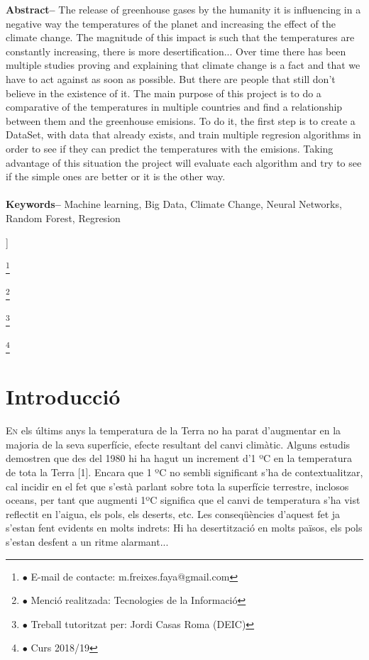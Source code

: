 \documentclass[10pt,a4paper,twocolumn,twoside]{article}
\newcommand\blfootnote[1]{%
  \begingroup
  \renewcommand\thefootnote{}\footnote{#1}%
  \addtocounter{footnote}{-1}%
  \endgroup
}
\begin{document}
\begin{@twocolumnfalse}
\begin{center}
{\textbf{Abstract--} The release of greenhouse gases by the humanity it is influencing in a negative way the temperatures of the planet and increasing the effect of the climate change. The magnitude of this impact is such that the temperatures are constantly increasing, there is more desertification... Over time there has been multiple studies proving and explaining that climate change is a fact and that we have to act against as soon as possible. But there are people that still don't believe in the existence of it. The main purpose of this project is to do a comparative of the temperatures in multiple countries and find a relationship between them and the greenhouse emisions. To do it, the first step is to create a DataSet, with data that already exists, and train multiple regresion algorithms in order to see if they can predict the temperatures with the emisions. Taking advantage of this situation the project will evaluate each algorithm and try to see if the simple ones are better or it is the other way. 
\\
\\
\textbf{Keywords-- } Machine learning, Big Data, Climate Change, Neural Networks, Random Forest, Regresion\\
}

\bigskip

{\vrule depth 0pt height 0.5pt width 4cm\hspace{7.5pt}%
%
\hspace{7.5pt}\vrule depth 0pt height 0.5pt width 4cm\relax}

\end{center}


\end{@twocolumnfalse}]

\blfootnote{$\bullet$ E-mail de contacte: m.freixes.faya@gmail.com}
\blfootnote{$\bullet$ Menció realitzada: Tecnologies de la Informació}
\blfootnote{$\bullet$ Treball tutoritzat per: Jordi Casas Roma (DEIC)}
\blfootnote{$\bullet$ Curs 2018/19}
\section{Introducció}
\lettrine[lines=3]{E}{n} els últims anys la temperatura de la Terra no ha parat d'augmentar en la majoria de la seva superfície, efecte resultant del canvi climàtic. Alguns estudis demostren que des del 1980 hi ha hagut un increment d'1 ºC en la temperatura de tota la Terra [1]. Encara que 1 ºC no sembli significant s'ha de contextualitzar, cal incidir en el fet que s'està parlant sobre tota la superfície terrestre, inclosos oceans, per tant que augmenti 1ºC significa que el canvi de temperatura s'ha vist reflectit en l'aigua, els pols, els deserts, etc. Les conseqüències d'aquest fet ja s'estan fent evidents en molts indrets: Hi ha desertització en molts països, els pols s'estan desfent a un ritme alarmant...
\end{document}
